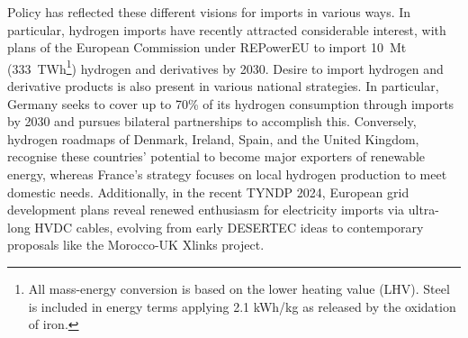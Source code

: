 
Policy has reflected these different visions for imports in various ways. In
particular, hydrogen imports have recently attracted considerable interest, with
plans of the European Commission under
\mbox{REPowerEU}\cite{europeancommissionRepowerEUPlan} to import 10~Mt
(333~TWh\footnote{All mass-energy conversion is based on the lower heating value
(LHV). Steel is included in energy terms applying 2.1 kWh/kg as released by the
oxidation of iron.}) hydrogen and derivatives by 2030. Desire to import hydrogen
and derivative products is also present in various national
strategies.\cite{corbeauNationalHydrogenStrategies2024} In particular, Germany
seeks to cover up to 70\% of its hydrogen consumption through imports by 2030
and pursues bilateral partnerships to accomplish
this.\cite{bundesministeriumfuerwirtschaftundklimaschutzFortschreibungNationalenWasserstoffstrategie2023}
Conversely, hydrogen roadmaps of
Denmark,\cite{danishministryofclimateenergyandutilitiesRegeringensStrategiPowertoX2021}
Ireland,\cite{departmentoftheenvironmentclimateandcommunicationsgovernmentofirelandNationalHydrogenStrategy2023}
Spain,\cite{marcoestrategicodeenergiayclimaRutaHidrogenoApuesta2020} and the
United
Kingdom,\cite{ukdepartmentforenergysecurity&netzeroHydrogenStrategyUpdate2023}
recognise these countries' potential to become major exporters of renewable
energy, whereas France's strategy focuses on local hydrogen production to meet
domestic needs.\cite{frenchgovernmentStrategieNationalePour2023} Additionally,
in the recent TYNDP 2024,\cite{entso-eTYNDP2024Project2024}  European grid
development plans reveal renewed enthusiasm for electricity imports via
ultra-long HVDC cables, evolving from early
DESERTEC\cite{desertecfoundationDESERTECSustainableWealth2024} ideas to
contemporary proposals like the Morocco-UK Xlinks
project.\cite{xlinksMoroccoUKPower2023}


